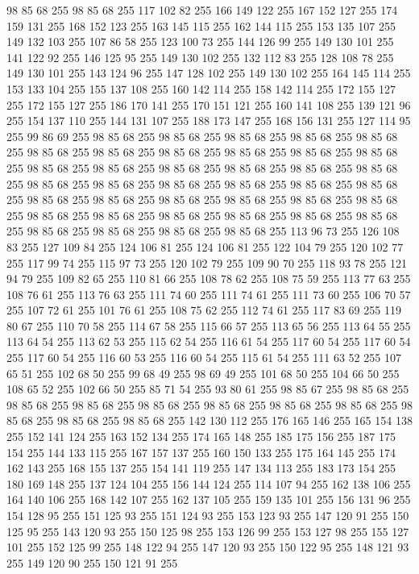 98 85 68 255 98 85 68 255 117 102 82 255 166 149 122 255 167 152 127 255 174 159 131 255 168 152 123 255 163 145 115 255 162 144 115 255 153 135 107 255 149 132 103 255 107 86 58 255 123 100 73 255 144 126 99 255 149 130 101 255 141 122 92 255 146 125 95 255 149 130 102 255 132 112 83 255 128 108 78 255 149 130 101 255 143 124 96 255 147 128 102 255 149 130 102 255 164 145 114 255 153 133 104 255 155 137 108 255 160 142 114 255 158 142 114 255 172 155 127 255 172 155 127 255 186 170 141 255 170 151 121 255 160 141 108 255 139 121 96 255 154 137 110 255 144 131 107 255 188 173 147 255 168 156 131 255 127 114 95 255 99 86 69 255 98 85 68 255 98 85 68 255 98 85 68 255 98 85 68 255 98 85 68 255 98 85 68 255 98 85 68 255 98 85 68 255 98 85 68 255 98 85 68 255 98 85 68 255 98 85 68 255 98 85 68 255 98 85 68 255 98 85 68 255 98 85 68 255 98 85 68 255 98 85 68 255 98 85 68 255 98 85 68 255 98 85 68 255 98 85 68 255 98 85 68 255
98 85 68 255 98 85 68 255 98 85 68 255 98 85 68 255 98 85 68 255 98 85 68 255 98 85 68 255 98 85 68 255 98 85 68 255 98 85 68 255 98 85 68 255 98 85 68 255 98 85 68 255 98 85 68 255 98 85 68 255 98 85 68 255 113 96 73 255 126 108 83 255 127 109 84 255 124 106 81 255 124 106 81 255 122 104 79 255 120 102 77 255 117 99 74 255 115 97 73 255 120 102 79 255 109 90 70 255 118 93 78 255 121 94 79 255 109 82 65 255 110 81 66 255 108 78 62 255 108 75 59 255 113 77 63 255 108 76 61 255 113 76 63 255 111 74 60 255 111 74 61 255 111 73 60 255 106 70 57 255 107 72 61 255 101 76 61 255 108 75 62 255 112 74 61 255 117 83 69 255 119 80 67 255 110 70 58 255 114 67 58 255 115 66 57 255 113 65 56 255 113 64 55 255 113 64 54 255 113 62 53 255 115 62 54 255 116 61 54 255 117 60 54 255 117 60 54 255 117 60 54 255 116 60 53 255 116 60 54 255 115 61 54 255 111 63 52 255 107 65 51 255 102 68 50 255
99 68 49 255 98 69 49 255 101 68 50 255 104 66 50 255 108 65 52 255 102 66 50 255 85 71 54 255 93 80 61 255 98 85 67 255 98 85 68 255 98 85 68 255 98 85 68 255 98 85 68 255 98 85 68 255 98 85 68 255 98 85 68 255 98 85 68 255 98 85 68 255 98 85 68 255 142 130 112 255 176 165 146 255 165 154 138 255 152 141 124 255 163 152 134 255 174 165 148 255 185 175 156 255 187 175 154 255 144 133 115 255 167 157 137 255 160 150 133 255 175 164 145 255 174 162 143 255 168 155 137 255 154 141 119 255 147 134 113 255 183 173 154 255 180 169 148 255 137 124 104 255 156 144 124 255 114 107 94 255 162 138 106 255 164 140 106 255 168 142 107 255 162 137 105 255 159 135 101 255 156 131 96 255 154 128 95 255 151 125 93 255 151 124 93 255 153 123 93 255 147 120 91 255 150 125 95 255 143 120 93 255 150 125 98 255 153 126 99 255 153 127 98 255 155 127 101 255 152 125 99 255 148 122 94 255 147 120 93 255 150 122 95 255 148 121 93 255 149 120 90 255 150 121 91 255
